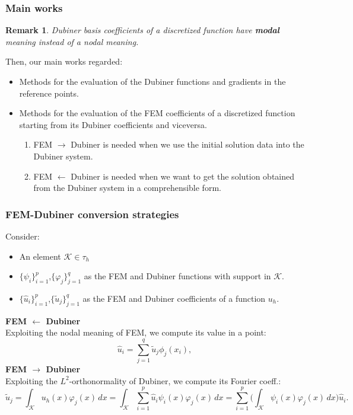 \documentclass[9pt]{beamer}
\newtheorem*{remark}{Remark}
\begin{document}
\begin{frame}
\frametitle{Main works}
\begin{remark}
	Dubiner basis coefficients of a discretized function have \textbf{modal} meaning instead of a \emph{nodal} meaning.
\end{remark}
Then, our main works regarded:
\begin{itemize}
	\item Methods for the evaluation of the Dubiner functions and gradients in the reference points.
	\item Methods for the evaluation of the FEM coefficients of a discretized function starting from its Dubiner coefficients and viceversa.
	\begin{enumerate}
		\item FEM $\rightarrow$ Dubiner is needed when we use the initial solution data into the Dubiner system.
		\item FEM $\leftarrow$ Dubiner is needed when we want to get the solution obtained from the Dubiner system in a comprehensible form. 
	\end{enumerate}
\end{itemize}
\end{frame}


\begin{frame}
\frametitle{FEM-Dubiner conversion strategies}
Consider:
\begin{itemize}
	\small
	\item An element $\mathcal{K}\in \tau_h$
	\item $\{\psi_{i}\}_{i=1}^{p}$,$\{\varphi_{j}\}_{j=1}^{q}$ as the FEM and Dubiner functions with support in $\mathcal{K}$. 
	\item $\{\hat{u}_i\}_{i=1}^p$,$\{\tilde{u}_j\}_{j=1}^q$ as the FEM and Dubiner coefficients of a function $u_h$.
\end{itemize} \vspace{4mm}
\textbf{FEM $\leftarrow$ Dubiner} \\
Exploiting the nodal meaning of FEM, we compute its value in a point:
\begin{equation*} \label{ref3}
\hat{u}_i = \sum_{j=1}^q \tilde{u}_j\phi_j(x_i),
\end{equation*}
\textbf{FEM $\rightarrow$ Dubiner} \\
Exploiting the $L^2$-orthonormality of Dubiner, we compute its Fourier coeff.:
\begin{equation*}\label{ref4}
\tilde{u}_j = \int_\mathcal{K} u_h(x) \varphi_j(x) \,dx = \int_{\mathcal{K}} \sum_{i=1}^p \hat{u}_i\psi_i(x) \varphi_j(x) \,dx = \sum_{i=1}^p \Big(\int_{\mathcal{K}}\psi_i(x)\varphi_j(x)\,dx \Big) \hat{u}_i.
\end{equation*}
\end{frame}
\end{document}
